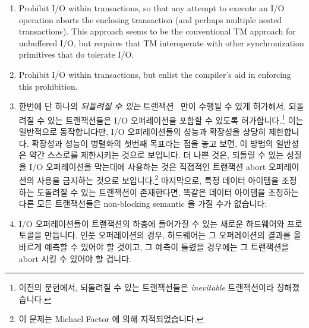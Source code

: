 \begin{enumerate}
\item	Prohibit I/O within transactions, so that any attempt to execute
	an I/O operation aborts the enclosing transaction (and perhaps
	multiple nested transactions).
	This approach seems to be the conventional TM approach for
	unbuffered I/O, but requires that TM interoperate with other
	synchronization primitives that do tolerate I/O.
\item	Prohibit I/O within transactions, but enlist the compiler's aid
	in enforcing this prohibition.
\fi
\item	한번에 단 하나의 \emph{되돌려질 수 있는}
	트랜잭션~\cite{SpearMichaelScott2008InevitableSTM} 만이 수행될 수 있게
	허가해서, 되돌려질 수 있는 트랜잭션들은 I/O 오퍼레이션을 포함할 수
	있도록 허가합니다.\footnote{
		이전의 문헌에서, 되돌려질 수 있는 트랜잭션들은
		\emph{inevitable} 트랜잭션이라 칭해졌습니다.}
	이는 일반적으로 동작합니다만, I/O 오퍼레이션들의 성능과 확장성을 상당히
	제한합니다.
	확장성과 성능이 병렬화의 첫번째 목표라는 점을 놓고 보면, 이 방법의
	일반성은 약간 스스로를 제한시키는 것으로 보입니다.
	더 나쁜 것은, 되돌릴 수 있는 성질을 I/O 오퍼레이션을 막는데에 사용하는
	것은 직접적인 트랜잭션 abort 오퍼레이션의 사용을 금지하는 것으로
	보입니다.\footnote{
		이 문제는 Michael Factor 에 의해 지적되었습니다.}
	마지막으로, 특정 데이터 아이템을 조정하는 도돌려질 수 있는 트랜잭션이
	존재한다면, 똑같은 데이터 아이템을 조정하는 다른 모든 트랜잭션들은
	non-blocking semantic 을 가질 수가 없습니다.

\item	I/O 오퍼레이션들이 트랜잭션의 하층에 들어가질 수 있는 새로운 하드웨어와
	프로토콜을 만듭니다.
	인풋 오퍼레이션의 경우, 하드웨어는 그 오퍼레이션의 결과를 올바르게
	예측할 수 있어야 할 것이고, 그 예측이 틀렸을 경우에는 그 트랜잭션을
	abort 시킬 수 있어야 할 겁니다.

\end{enumerate}

